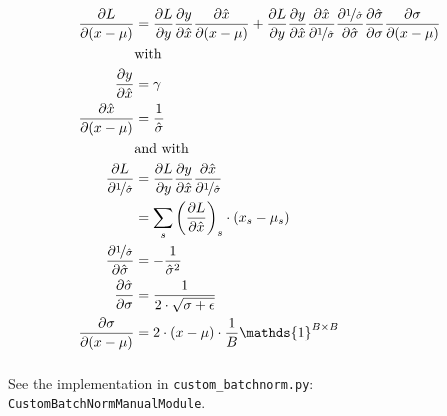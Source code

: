 \documentclass{article}
\newcommand\·{\ensuremath{\cdot}}
\newcommand\…{\ensuremath{\dots}}
\renewcommand\t{\ensuremath{\times}}
\newcommand{\⇔}{\ensuremath{\iff}}
\newcommand{\⇐}{\ensuremath{\impliedby}}
\newcommand{\⇒}{\ensuremath{\implies}}
\newcommand\f[2]{\ensuremath{\frac{#1}{#2}}}
\newcommand\nf[2]{\ensuremath{\nicefrac{#1}{#2}}}
\newcommand\pf[2]{\ensuremath{\frac{\partial {#1}}{\partial {#2}}}}
\newcommand\1{\ensuremath{\mathds{1}}}
\newcommand\ℝ{\ensuremath{\mathds{R}}}
\begin{document}
\begin{align*}
  \pf{L}{(x-\mu)} &= \pf{L}{y}\pf{y}{\hat{x}}\pf{\hat{x}}{(x-\mu)} + \pf{L}{y}\pf{y}{\hat{x}}\pf{\hat{x}}{\nf{1}{\hat{\sigma}}}\pf{\nf{1}{\hat{\sigma}}}{\hat{\sigma}}\pf{\hat{\sigma}}{\sigma}\pf{\sigma}{(x-\mu)}\\
  &\text{with}\\
  \pf{y}{\hat{x}} &= \gamma\\
  \pf{\hat{x}}{(x-\mu)} &= \f{1}{\hat{\sigma}}\\
  &\text{and with}\\
  \pf{L}{\nf{1}{\hat{\sigma}}}
  &= \pf{L}{y}\pf{y}{\hat{x}}\pf{\hat{x}}{\nf{1}{\hat{\sigma}}}\\
  &= \sum_s \left(\pf{L}{\hat{x}}\right)_s\·(x_s-\mu_s)\\
  \pf{\nf{1}{\hat{\sigma}}}{\hat{\sigma}} &= -\f{1}{\hat{\sigma}^2}\\
  \pf{\hat{\sigma}}{\sigma} &= \f{1}{2\·\sqrt{\sigma+\epsilon}}\\
  \pf{\sigma}{(x-\mu)} &= 2\·(x-\mu)\·\f{1}{B}\1^{B\t B}\\
\end{align*}

\subsubsection{}

\subsubsection{}
See the implementation in \texttt{custom\_batchnorm.py}: \texttt{CustomBatchNormManualModule}.
\end{document}
